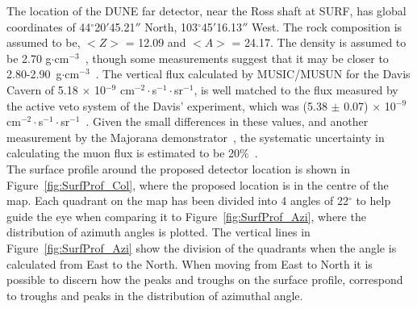 The location of the DUNE far detector, near the Ross shaft at SURF, has global coordinates of 44$^{\circ}$20$'$45.21$''$ North, 103$^{\circ}$45$'$16.13$''$ West. The rock composition is assumed to be, $< Z >$ = 12.09 and $< A >$ = 24.17. The density is assumed to be 2.70 g$\cdot$cm$^{-3}$~\citep{Mei:2009py}, though some measurements suggest that it may be closer to 2.80-2.90~g$\cdot$cm$^{-3}$~\citep{Gray:2010nc, Heise:2014gta}. The vertical flux calculated by MUSIC/MUSUN for the Davis Cavern of 5.18 $\times$ 10$^{-9}$ cm$^{-2}\cdot$s$^{-1}\cdot$sr$^{-1}$, is well matched to the flux measured by the active veto system of the Davis' experiment, which was (5.38 $\pm$ 0.07) $\times$ 10$^{-9}$ cm$^{-2}\cdot$s$^{-1}\cdot$sr$^{-1}$~\citep{PhysRevD.27.1444}. Given the small differences in these values, and another measurement by the Majorana demonstrator~\citep{Abgrall:2016cfi}, the systematic uncertainty in calculating the muon flux is estimated to be 20\%~\citep{NDKTFNote}. \\

The surface profile around the proposed detector location is shown in Figure~\ref{fig:SurfProf_Col}, where the proposed location is in the centre of the map. Each quadrant on the map has been divided into 4 angles of 22$^{\circ}$ to help guide the eye when comparing it to Figure~\ref{fig:SurfProf_Azi}, where the distribution of azimuth angles is plotted. The vertical lines in Figure~\ref{fig:SurfProf_Azi} show the division of the quadrants when the angle is calculated from East to the North. When moving from East to North it is possible to discern how the peaks and troughs on the surface profile, correspond to troughs and peaks in the distribution of azimuthal angle. \\


